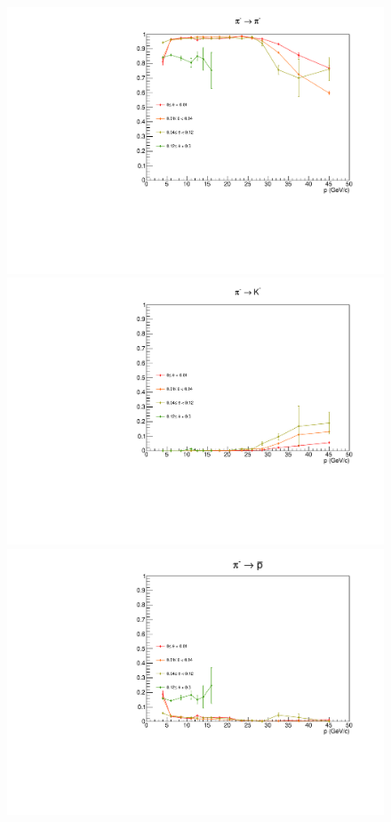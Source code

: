 \begin{figure}[!p]
  \centering
	\includegraphics[scale=0.38]{./gfx/pim_pi_less.pdf}
  \includegraphics[scale=0.38]{./gfx/pim_K_less.pdf}
  \includegraphics[scale=0.38]{./gfx/pim_p_less.pdf}

\end{figure}
